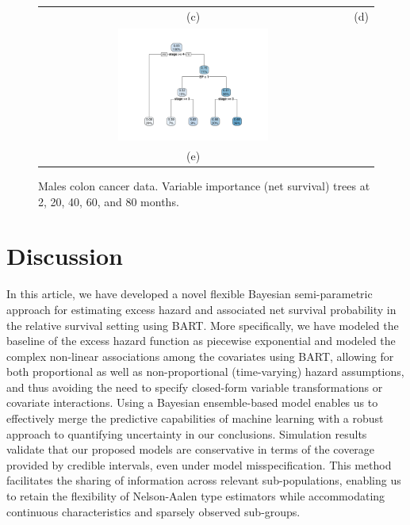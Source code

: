 \documentclass[12pt]{article}
\begin{document}
\begin{figure}
\begin{tabular}{cc}
   (c) & (d) \\
   \includegraphics[width=0.5\textwidth]{rpart40_males.pdf} & \\
   (e) 
\end{tabular}
\caption{ Males colon cancer data. Variable importance (net survival) trees at 2, 20, 40, 60, and 80 months.}
\label{fig:tree_males}
\end{figure}

\section{Discussion}\label{sec:discussion}

In this article, we have developed a novel flexible Bayesian semi-parametric
approach for estimating excess hazard and associated net survival probability in
the relative survival setting using BART. More specifically, we have modeled the
baseline of the excess hazard function as piecewise exponential and modeled the
complex non-linear associations among the covariates using BART, allowing for
both proportional as well as non-proportional (time-varying) hazard assumptions,
and thus avoiding the need to specify closed-form variable transformations or
covariate interactions. Using a Bayesian ensemble-based model enables us to
effectively merge the predictive capabilities of machine learning with a robust
approach to quantifying uncertainty in our conclusions. Simulation results
validate that our proposed models are conservative in terms of the coverage
provided by credible intervals, even under model misspecification. This method
facilitates the sharing of information across relevant sub-populations, enabling
us to retain the flexibility of Nelson-Aalen type estimators while accommodating
continuous characteristics and sparsely observed sub-groups. 
\end{document}
